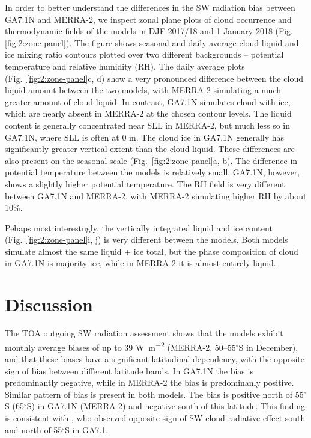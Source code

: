 In order to better understand the differences in the SW radiation bias between
GA7.1N and MERRA-2, we inspect zonal plane plots of cloud occurrence and
thermodynamic fields of the models in DJF 2017/18 and 1 January 2018 (Fig.
\ref{fig:2:zone-panel}). The figure shows seasonal and daily average cloud liquid
and ice mixing ratio contours plotted over two different backgrounds --
potential temperature and relative humidity (RH). The daily average plots
(Fig.~\ref{fig:2:zone-panel}c, d) show a very pronounced difference between
the cloud liquid amount between the two models, with MERRA-2 simulating a much
greater amount of cloud liquid. In contrast, GA7.1N simulates cloud with ice,
which are nearly absent in MERRA-2 at the chosen contour levels. The liquid
content is generally concentrated near SLL in MERRA-2, but much less so in GA7.1N,
where SLL is often at 0 m. The cloud ice in GA7.1N generally has significantly
greater vertical extent than the cloud liquid. These differences are also
present on the seasonal scale (Fig.~\ref{fig:2:zone-panel}a, b). The difference
in potential temperature between the models is relatively small. GA7.1N, however,
shows a slightly higher potential temperature.
The RH field is very different between GA7.1N and MERRA-2, with MERRA-2
simulating higher RH by about 10\%.

Pehaps most interestngly, the vertically integrated liquid and ice content
(Fig.~\ref{fig:2:zone-panel}i, j) is very different between the models. Both
models simulate almost the same liquid + ice total, but the phase composition
of cloud in GA7.1N is majority ice, while in MERRA-2 it is almost entirely
liquid.

\section{Discussion}

The TOA outgoing SW radiation assessment shows that the models exhibit monthly
average biases of up to 39 \unit{W m^{-2}} (MERRA-2, 50--55$^\circ$S in
December), and that these biases have a significant latitudinal dependency,
with the opposite sign of bias between different latitude bands. In GA7.1N the
bias is predominantly negative, while in MERRA-2 the bias is predominanly
positive. Similar pattern of bias is present in both models. The bias is positive
north of 55$^\circ$S (65$^\circ$S) in GA7.1N (MERRA-2) and negative south of
this latitude.
This finding is consistent with \cite{schuddeboom2019}, who observed opposite
sign of SW cloud radiative effect south and north of 55$^\circ$S in GA7.1.

